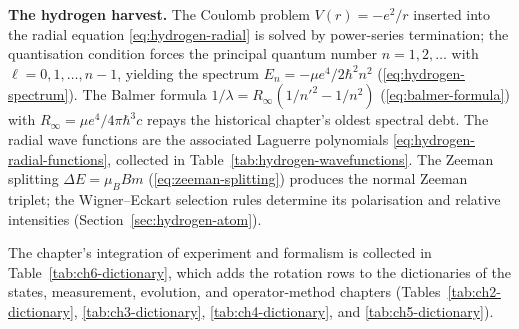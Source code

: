 \textbf{The hydrogen harvest.} The Coulomb problem $V(r) = -e^2/r$ inserted into the radial equation \eqref{eq:hydrogen-radial} is solved by power-series termination; the quantisation condition forces the principal quantum number $n=1,2,\ldots$ with $\ell=0,1,\ldots,n-1$, yielding the spectrum $E_n = -\mu e^4/2\hbar^2 n^2$ (\eqref{eq:hydrogen-spectrum}). The Balmer formula $1/\lambda = R_\infty(1/n'^2-1/n^2)$ (\eqref{eq:balmer-formula}) with $R_\infty = \mu e^4/4\pi\hbar^3 c$ repays the historical chapter's oldest spectral debt. The radial wave functions are the associated Laguerre polynomials \eqref{eq:hydrogen-radial-functions}, collected in Table~\ref{tab:hydrogen-wavefunctions}. The Zeeman splitting $\Delta E = \mu_B B m$ (\eqref{eq:zeeman-splitting}) produces the normal Zeeman triplet; the Wigner--Eckart selection rules determine its polarisation and relative intensities (Section~\ref{sec:hydrogen-atom}).

The chapter's integration of experiment and formalism is collected in Table~\ref{tab:ch6-dictionary}, which adds the rotation rows to the dictionaries of the states, measurement, evolution, and operator-method chapters (Tables~\ref{tab:ch2-dictionary}, \ref{tab:ch3-dictionary}, \ref{tab:ch4-dictionary}, and \ref{tab:ch5-dictionary}).

